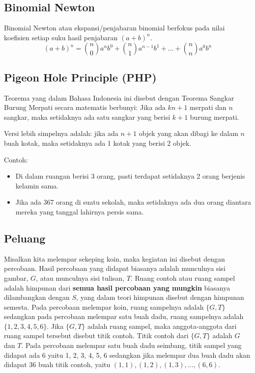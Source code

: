 \subsection{Binomial Newton}
Binomial Newton atau ekspansi/penjabaran binomial berfokus pada nilai koefisien setiap suku hasil penjabaran $(a+b)^n$.
$$(a+b)^n = {n \choose 0} a^nb^0 + {n \choose 1} a^{n-1}b^1+ \dots +{n \choose n}a^0b^n$$

\subsection{Pigeon Hole Principle (PHP)}
Teorema yang dalam Bahasa Indonesia ini disebut dengan Teorema Sangkar Burung Merpati secara matematis berbunyi:
Jika ada $kn+1$ merpati dan $n$ sangkar, maka setidaknya ada satu sangkar yang berisi $k+1$ burung merpati.

Versi lebih simpelnya adalah: jika ada $n+1$ objek yang akan dibagi ke dalam $n$ buah kotak, maka setidaknya ada 1 kotak yang berisi 2 objek.

Contoh: \begin{itemize}
    \item Di dalam ruangan berisi 3 orang, pasti terdapat setidaknya 2 orang berjenis kelamin sama.
    \item Jika ada 367 orang di suatu sekolah, maka setidaknya ada dua orang diantara mereka yang tanggal lahirnya persis sama.
\end{itemize}

\subsection{Peluang}
Misalkan kita melempar sekeping koin, maka kegiatan ini disebut dengan percobaan. Hasil percobaan yang didapat biasanya adalah munculnya sisi gambar, $G$, atau munculnya sisi tulisan, $T$. Ruang contoh atau ruang sampel adalah himpunan dari \textbf{semua hasil percobaan yang mungkin} biasanya dilambangkan dengan $S$, yang dalam teori himpunan disebut dengan himpunan semesta. Pada percobaan melempar koin, ruang sampelnya adalah $\{G, T\}$ sedangkan pada percobaan melempar satu buah dadu, ruang sampelnya adalah $\{1, 2, 3, 4, 5, 6\}$. Jika $\{G, T\}$ adalah ruang sampel, maka anggota-anggota dari ruang sampel tersebut disebut titik contoh. Titik contoh dari $\{G, T\}$ adalah $G$ dan $T$. Pada percobaan melempar satu buah dadu seimbang, titik sampel yang didapat ada 6 yaitu 1, 2, 3, 4, 5, 6 sedangkan jika melempar dua buah dadu akan didapat 36 buah titik contoh, yaitu $(1, 1), (1, 2), (1, 3), \dots , (6, 6)$. 

